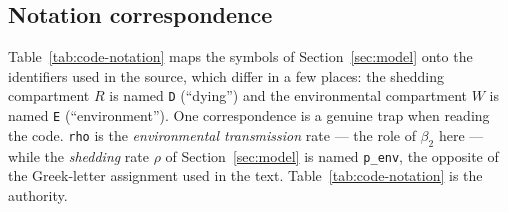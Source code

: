 \documentclass[11pt]{article}
\begin{document}
\subsection{Notation correspondence}

Table~\ref{tab:code-notation} maps the symbols of Section~\ref{sec:model} onto the identifiers used in the source, which differ in a few places: the shedding compartment $R$ is named \texttt{D} (``dying'') and the environmental compartment $W$ is named \texttt{E} (``environment''). One correspondence is a genuine trap when reading the code. \texttt{rho} is the \emph{environmental transmission} rate --- the role of $\beta_2$ here --- while the \emph{shedding} rate $\rho$ of Section~\ref{sec:model} is named \texttt{p\_env}, the opposite of the Greek-letter assignment used in the text. Table~\ref{tab:code-notation} is the authority.
\end{document}
